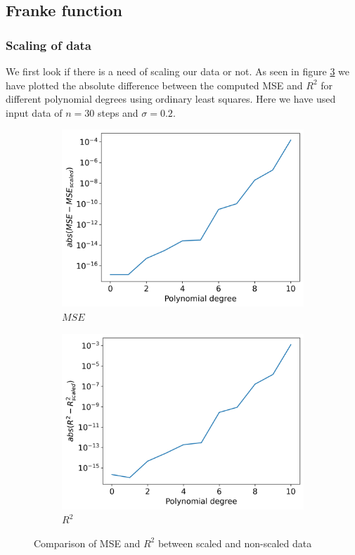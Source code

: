 \documentclass[12pt]{article}
\begin{document}
\subsection{Franke function}
\subsubsection{Scaling of data}
We first look if there is a need of scaling our data or not. As seen in figure \ref{fig:compare_scale} we have plotted the absolute difference between the computed MSE and $R^2$ for different polynomial degrees using ordinary least squares. Here we have used input data of $n=30$ steps and $\sigma=0.2$.
\begin{figure}[H]
  \begin{subfigure}{.5\textwidth}
    \centering
    \includegraphics[width=\textwidth]{../figures/compare_scale_mse.png}
    \caption{$MSE$}
    \label{fig:}
  \end{subfigure}
  \begin{subfigure}{.5\textwidth}
    \centering
    \includegraphics[width=\textwidth]{../figures/compare_scale_r2.png}
    \caption{$R^2$}
    \label{fig:}
  \end{subfigure}
  \caption{Comparison of MSE and $R^2$ between scaled and non-scaled data}
  \label{fig:compare_scale}
\end{figure}
\end{document}
